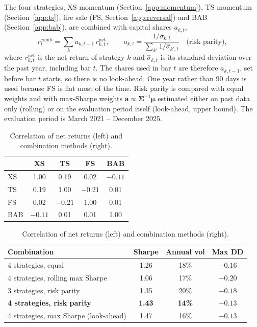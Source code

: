 \documentclass[aps,prl,onecolumn,superscriptaddress,nofootinbib]{revtex4-2}
\begin{document}
	The four strategies, XS momentum (Section~\ref{app:momentum}), TS momentum (Section~\ref{app:ts}), fire sale (FS, Section~\ref{app:reversal}) and BAB (Section~\ref{app:bab}), are combined with capital shares $a_{k,t}$,
	\begin{equation}
		r^{\mathrm{comb}}_t = \sum_{k} a_{k,t-1}\, r^{\mathrm{net}}_{k,t}, \qquad
		a_{k,t} = \frac{1/\hat\sigma_{k,t}}{\sum_{k'} 1/\hat\sigma_{k',t}} \quad \text{(risk parity)},
		\label{eq:combo}
	\end{equation}
	where $r^{\mathrm{net}}_{k,t}$ is the net return of strategy $k$ and $\hat\sigma_{k,t}$ is its standard deviation over the past year, including bar $t$. The shares used in bar $t$ are therefore $a_{k,t-1}$, set before bar $t$ starts, so there is no look-ahead. One year rather than 90 days is used because FS is flat most of the time. Risk parity is compared with equal weights and with max-Sharpe weights $\bm a \propto \bm\Sigma^{-1}\bm\mu$ estimated either on past data only (rolling) or on the evaluation period itself (look-ahead, upper bound). The evaluation period is March 2021 -- December 2025.
	
	\begin{table}[!htbp]
		\caption{Correlation of net returns (left) and combination methods (right).}
		\label{tab:combo}
		\begin{minipage}{0.36\linewidth}
			\begin{ruledtabular}
				\begin{tabular}{lcccc}
					& XS      & TS      & FS      & BAB \\
					\hline
					XS  & 1.00    & 0.19    & 0.02    & $-0.11$ \\
					TS  & 0.19    & 1.00    & $-0.21$ & 0.01 \\
					FS  & 0.02    & $-0.21$ & 1.00    & 0.01 \\
					BAB & $-0.11$ & 0.01    & 0.01    & 1.00 \\
				\end{tabular}
			\end{ruledtabular}
		\end{minipage}\hfill
		\begin{minipage}{0.6\linewidth}
			\begin{ruledtabular}
				\begin{tabular}{lccc}
					Combination & Sharpe & Annual vol & Max DD \\
					\hline
					4 strategies, equal                    & 1.26 & 18\% & $-0.16$ \\
					4 strategies, rolling max Sharpe       & 1.06 & 17\% & $-0.20$ \\
					3 strategies, risk parity              & 1.35 & 20\% & $-0.18$ \\
					\textbf{4 strategies, risk parity}     & \textbf{1.43} & \textbf{14\%} & $\mathbf{-0.13}$ \\
					4 strategies, max Sharpe (look-ahead)  & 1.47 & 16\% & $-0.13$ \\
				\end{tabular}
			\end{ruledtabular}
		\end{minipage}
	\end{table}
	
\end{document}
